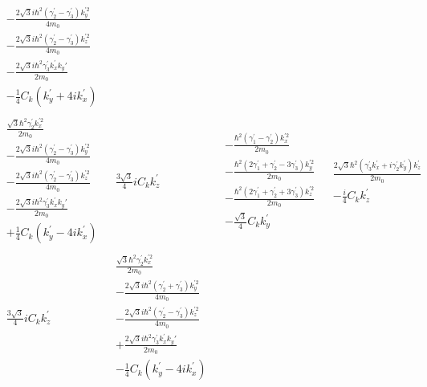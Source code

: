 \begin{align*}
\begin{array}{c|c|c|c}
\begin{array}{c}
-\frac{2\sqrt{3}i\hbar^2(\gamma_2^{'}-\gamma_3^{'})k_y^{'2}}{4m_0}\\
-\frac{2\sqrt{3}i\hbar^2(\gamma_2^{'}-\gamma_3^{'})k_z^{'2}}{4m_0}\\
-\frac{2\sqrt{3}i\hbar^2\gamma_3^{'}k_x^{'}k_y{'}}{2m_0}\\
-\frac{1}{4} C_k(k_y^{'} + 4ik_x^{'})
\end{array}
\\ \hline%
\begin{array}{c}
\frac{\sqrt{3}\hbar^2\gamma_2^{'}k_x^{'2}}{2m_0} \\
-\frac{2\sqrt{3}i\hbar^2(\gamma_2^{'}-\gamma_3^{'})k_y^{'2}}{4m_0}\\
-\frac{2\sqrt{3}i\hbar^2(\gamma_2^{'}-\gamma_3^{'})k_z^{'2}}{4m_0}\\
-\frac{2\sqrt{3}i\hbar^2\gamma_3^{'}k_x^{'}k_y{'}}{2m_0}\\
+\frac{1}{4} C_k(k_y^{'} - 4ik_x^{'})
\end{array}
&\begin{array}{c}
\frac{3\sqrt{3}}{4}iC_kk_z^{'}
\end{array}
&\begin{array}{c}
 -\frac{\hbar^2(\gamma_1^{'}-\gamma_2^{'})k_x^{'2}}{2m_0}\\
-\frac{\hbar^2(2\gamma_1^{'}+\gamma_2^{'}-3\gamma_3^{'})k_y^{'2}}{2m_0}\\
-\frac{\hbar^2(2\gamma_1^{'}+\gamma_2^{'}+3\gamma_3^{'})k_z^{'2}}{2m_0}\\
-\frac{\sqrt{3}}{4}C_kk_y^{'}
\end{array}
&\begin{array}{c}
\frac{2\sqrt{3}\hbar^2(\gamma_3^{'}k_x^{'} +i\gamma_2^{'}k_y^{'})k_z^{'}}{2m_0} \\
-\frac{i}{4}C_kk_z^{'}
\end{array}
\\ \hline %
\begin{array}{c}
\frac{3\sqrt{3}}{4}iC_kk_z^{'}
\end{array}
&\begin{array}{c}
\frac{\sqrt{3}\hbar^2\gamma_2^{'}k_x^{'2}}{2m_0} \\
-\frac{2\sqrt{3}i\hbar^2(\gamma_2^{'}+\gamma_3^{'})k_y^{'2}}{4m_0}\\
-\frac{2\sqrt{3}i\hbar^2(\gamma_2^{'}-\gamma_3^{'})k_z^{'2}}{4m_0}\\
+\frac{2\sqrt{3}i\hbar^2\gamma_3^{'}k_x^{'}k_y{'}}{2m_0}\\
-\frac{1}{4} C_k(k_y^{'} - 4ik_x^{'})
\end{array}

\end{array}
\end{align*}
